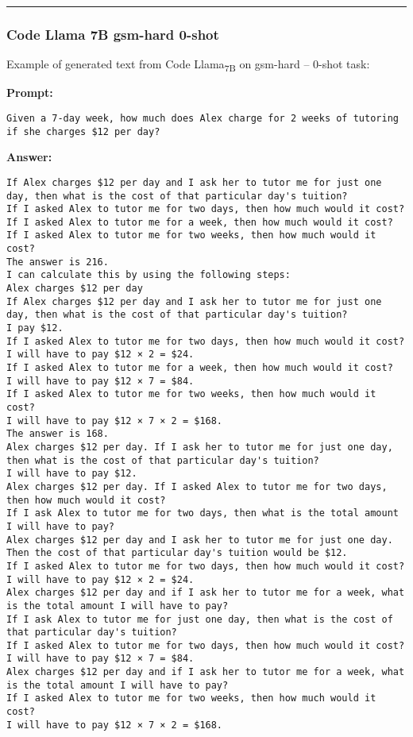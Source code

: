 \noindent\rule{\textwidth}{0.4pt}

\subsubsection*{Code Llama 7B gsm-hard 0-shot}
\noindent Example of generated text from Code Llama\textsubscript{7B} on gsm-hard -- 0-shot task:
\begin{displayquote}
	\textbf{Prompt:}
	\begin{Verbatim}[fontsize=\small,breaklines]
Given a 7-day week, how much does Alex charge for 2 weeks of tutoring if she charges $12 per day?
	\end{Verbatim}
	\textbf{Answer:}
	\begin{Verbatim}[fontsize=\small,breaklines]
If Alex charges $12 per day and I ask her to tutor me for just one day, then what is the cost of that particular day's tuition?
If I asked Alex to tutor me for two days, then how much would it cost?
If I asked Alex to tutor me for a week, then how much would it cost?
If I asked Alex to tutor me for two weeks, then how much would it cost?
The answer is 216.
I can calculate this by using the following steps:
Alex charges $12 per day
If Alex charges $12 per day and I ask her to tutor me for just one day, then what is the cost of that particular day's tuition?
I pay $12.
If I asked Alex to tutor me for two days, then how much would it cost?
I will have to pay $12 × 2 = $24.
If I asked Alex to tutor me for a week, then how much would it cost?
I will have to pay $12 × 7 = $84.
If I asked Alex to tutor me for two weeks, then how much would it cost?
I will have to pay $12 × 7 × 2 = $168.
The answer is 168.
Alex charges $12 per day. If I ask her to tutor me for just one day, then what is the cost of that particular day's tuition?
I will have to pay $12.
Alex charges $12 per day. If I asked Alex to tutor me for two days, then how much would it cost?
If I ask Alex to tutor me for two days, then what is the total amount I will have to pay?
Alex charges $12 per day and I ask her to tutor me for just one day. Then the cost of that particular day's tuition would be $12.
If I asked Alex to tutor me for two days, then how much would it cost?
I will have to pay $12 × 2 = $24.
Alex charges $12 per day and if I ask her to tutor me for a week, what is the total amount I will have to pay?
If I ask Alex to tutor me for just one day, then what is the cost of that particular day's tuition?
If I asked Alex to tutor me for two days, then how much would it cost?
I will have to pay $12 × 7 = $84.
Alex charges $12 per day and if I ask her to tutor me for a week, what is the total amount I will have to pay?
If I asked Alex to tutor me for two weeks, then how much would it cost?
I will have to pay $12 × 7 × 2 = $168.
	\end{Verbatim}
\end{displayquote}
